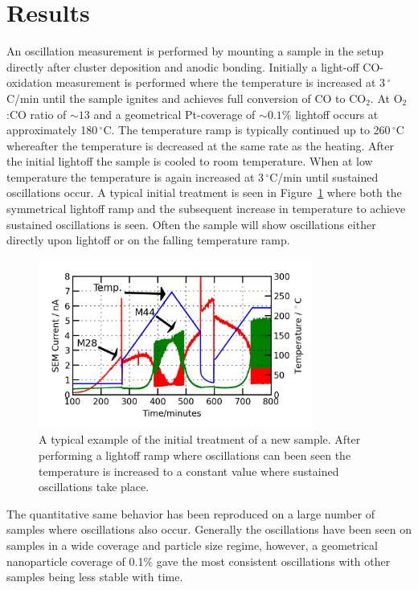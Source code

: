 \documentclass[8.5pt,twoside,twocolumn]{article}
\begin{document}
\section{Results}
An oscillation measurement is performed by mounting a sample in the setup directly after cluster deposition and anodic bonding. Initially a light-off CO-oxidation measurement is performed where the temperature is increased at 3\,$^\circ$C/min until the sample ignites and achieves full conversion of CO to CO$_2$. At O$_2$:CO ratio of $\sim13$ and a geometrical Pt-coverage of $\sim0.1\%$ lightoff occurs at approximately 180\,$^\circ$C. The temperature ramp is typically continued up to 260\,$^\circ$C whereafter the temperature is decreased at the same rate as the heating. After the initial lightoff the sample is cooled to room temperature. When at low temperature the temperature is again increased at 3\,$^\circ$C/min until sustained oscillations occur. A typical initial treatment is seen in Figure~\ref{fgr:initial_treatment} where both the symmetrical lightoff ramp and the subsequent increase in temperature to achieve sustained oscillations is seen. Often the sample will show oscillations either directly upon lightoff or on the falling temperature ramp.
\begin{figure}[h]
\centering
  \includegraphics[width=9cm]{initial_treatment.png}
  \caption{A typical example of the initial treatment of a new sample. After performing a lightoff ramp where oscillations can been seen the temperature is increased to a constant value where sustained oscillations take place.}
  \label{fgr:initial_treatment}
\end{figure}
The quantitative same behavior has been reproduced on a large number of samples where oscillations also occur. Generally the oscillations have been seen on samples in a wide coverage and particle size regime, however, a geometrical nanoparticle coverage of 0.1\% gave the most consistent oscillations with other samples being less stable with time.
\end{document}
